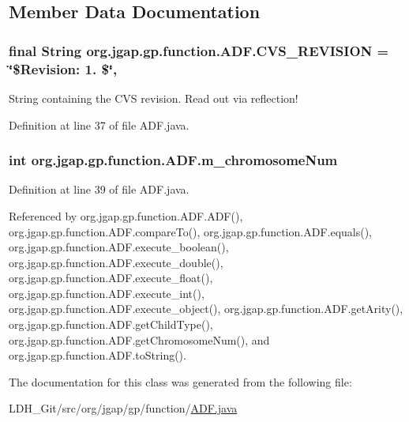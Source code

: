 \subsection{Member Data Documentation}
\hypertarget{classorg_1_1jgap_1_1gp_1_1function_1_1_a_d_f_ada15fe1d91f5a31330979c9afc967ed2}{
\subsubsection[{C\-V\-S\-\_\-\-R\-E\-V\-I\-S\-I\-O\-N}]{\setlength{\rightskip}{0pt plus 5cm}final String org.\-jgap.\-gp.\-function.\-A\-D\-F.\-C\-V\-S\-\_\-\-R\-E\-V\-I\-S\-I\-O\-N = \char`\"{}\$Revision\-: 1. \$\char`\"{}\hspace{0.3cm}{\ttfamily [static]}, {\ttfamily [private]}}}\label{classorg_1_1jgap_1_1gp_1_1function_1_1_a_d_f_ada15fe1d91f5a31330979c9afc967ed2}
String containing the C\-V\-S revision. Read out via reflection! 

Definition at line 37 of file A\-D\-F.\-java.

\hypertarget{classorg_1_1jgap_1_1gp_1_1function_1_1_a_d_f_a3d113b74e9c0e69bf6127e904de37766}{
\subsubsection[{m\-\_\-chromosome\-Num}]{\setlength{\rightskip}{0pt plus 5cm}int org.\-jgap.\-gp.\-function.\-A\-D\-F.\-m\-\_\-chromosome\-Num\hspace{0.3cm}{\ttfamily [private]}}}\label{classorg_1_1jgap_1_1gp_1_1function_1_1_a_d_f_a3d113b74e9c0e69bf6127e904de37766}


Definition at line 39 of file A\-D\-F.\-java.



Referenced by org.\-jgap.\-gp.\-function.\-A\-D\-F.\-A\-D\-F(), org.\-jgap.\-gp.\-function.\-A\-D\-F.\-compare\-To(), org.\-jgap.\-gp.\-function.\-A\-D\-F.\-equals(), org.\-jgap.\-gp.\-function.\-A\-D\-F.\-execute\-\_\-boolean(), org.\-jgap.\-gp.\-function.\-A\-D\-F.\-execute\-\_\-double(), org.\-jgap.\-gp.\-function.\-A\-D\-F.\-execute\-\_\-float(), org.\-jgap.\-gp.\-function.\-A\-D\-F.\-execute\-\_\-int(), org.\-jgap.\-gp.\-function.\-A\-D\-F.\-execute\-\_\-object(), org.\-jgap.\-gp.\-function.\-A\-D\-F.\-get\-Arity(), org.\-jgap.\-gp.\-function.\-A\-D\-F.\-get\-Child\-Type(), org.\-jgap.\-gp.\-function.\-A\-D\-F.\-get\-Chromosome\-Num(), and org.\-jgap.\-gp.\-function.\-A\-D\-F.\-to\-String().



The documentation for this class was generated from the following file\-:\begin{DoxyCompactItemize}
\item 
L\-D\-H\-\_\-\-Git/src/org/jgap/gp/function/\hyperlink{_a_d_f_8java}{A\-D\-F.\-java}\end{DoxyCompactItemize}

